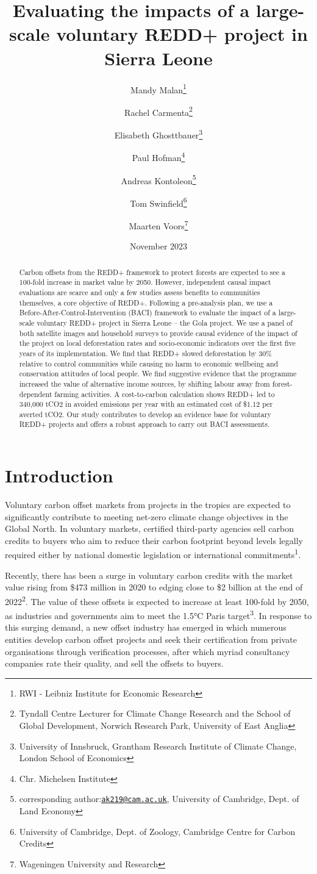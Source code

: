 \documentclass[
]{article}
\title{Evaluating the impacts of a large-scale voluntary REDD+ project
in Sierra Leone}
\author{Mandy Malan\footnote{RWI - Leibniz Institute for Economic
  Research} \and Rachel Carmenta\footnote{Tyndall Centre Lecturer for
  Climate Change Research and the School of Global Development, Norwich
  Research Park, University of East Anglia} \and Elisabeth
Ghosttbauer\footnote{University of Innsbruck, Grantham Research
  Institute of Climate Change, London School of Economics} \and Paul
Hofman\footnote{Chr. Michelsen Institute} \and Andreas
Kontoleon\footnote{corresponding
  author:\href{mailto:ak219@cam.ac.uk}{\nolinkurl{ak219@cam.ac.uk}},
  University of Cambridge, Dept. of Land Economy} \and Tom
Swinfield\footnote{ University of Cambridge, Dept. of Zoology, Cambridge
  Centre for Carbon Credits} \and Maarten Voors\footnote{Wageningen
  University and Research}}
\date{November 2023}
\begin{document}
\maketitle
\begin{abstract}
Carbon offsets from the REDD+ framework to protect forests are expected
to see a 100-fold increase in market value by 2050. However, independent
causal impact evaluations are scarce and only a few studies assess
benefits to communities themselves, a core objective of REDD+. Following
a pre-analysis plan, we use a Before-After-Control-Intervention (BACI)
framework to evaluate the impact of a large-scale voluntary REDD+
project in Sierra Leone -- the Gola project. We use a panel of both
satellite images and household surveys to provide causal evidence of the
impact of the project on local deforestation rates and socio-economic
indicators over the first five years of its implementation. We find that
REDD+ slowed deforestation by 30\% relative to control communities while
causing no harm to economic wellbeing and conservation attitudes of
local people. We find suggestive evidence that the programme increased
the value of alternative income sources, by shifting labour away from
forest-dependent farming activities. A cost-to-carbon calculation shows
REDD+ led to 340,000 tCO2 in avoided emissions per year with an
estimated cost of \$1.12 per averted tCO2. Our study contributes to
develop an evidence base for voluntary REDD+ projects and offers a
robust approach to carry out BACI assessments.
\end{abstract}

\clearpage

\hypertarget{introduction}{%
\section{Introduction}\label{introduction}}

Voluntary carbon offset markets from projects in the tropics are
expected to significantly contribute to meeting net-zero climate change
objectives in the Global North. In voluntary markets, certified
third-party agencies sell carbon credits to buyers who aim to reduce
their carbon footprint beyond levels legally required either by national
domestic legislation or international commitments\textsuperscript{1}.

Recently, there has been a surge in voluntary carbon credits with the
market value rising from \$473 million in 2020 to edging close to \$2
billion at the end of 2022\textsuperscript{2}. The value of these
offsets is expected to increase at least 100-fold by 2050, as industries
and governments aim to meet the 1.5°C Paris target\textsuperscript{3}.
In response to this surging demand, a new offset industry has emerged in
which numerous entities develop carbon offset projects and seek their
certification from private organisations through verification processes,
after which myriad consultancy companies rate their quality, and sell
the offsets to buyers.
\end{document}
